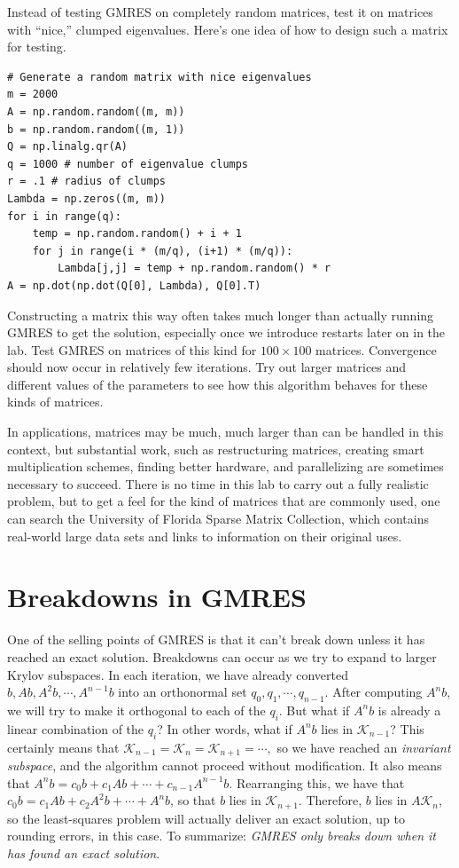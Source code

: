 \begin{problem}
Instead of testing GMRES on completely random matrices, test it on matrices with ``nice,'' clumped eigenvalues.
Here's one idea of how to design such a matrix for testing.
\begin{lstlisting}
# Generate a random matrix with nice eigenvalues
m = 2000
A = np.random.random((m, m))
b = np.random.random((m, 1))
Q = np.linalg.qr(A)
q = 1000 # number of eigenvalue clumps
r = .1 # radius of clumps
Lambda = np.zeros((m, m))
for i in range(q):
    temp = np.random.random() + i + 1
    for j in range(i * (m/q), (i+1) * (m/q)):
        Lambda[j,j] = temp + np.random.random() * r
A = np.dot(np.dot(Q[0], Lambda), Q[0].T)
\end{lstlisting}
Constructing a matrix this way often takes much longer than actually running GMRES to get the solution, especially once we introduce restarts later on in the lab.
Test GMRES on matrices of this kind for $100\times 100$ matrices.
Convergence should now occur in relatively few iterations.
Try out larger matrices and different values of the parameters to see how this algorithm behaves for these kinds of matrices.
\label{prob:GMRESClumps}
\end{problem}

\begin{info}
In applications, matrices may be much, much larger than can be handled in this context, but substantial work, such as restructuring matrices, creating smart multiplication schemes, finding better hardware, and parallelizing are sometimes necessary to succeed.
There is no time in this lab to carry out a fully realistic problem, but to get a feel for the kind of matrices that are commonly used, one can search the University of Florida Sparse Matrix Collection, which contains real-world large data sets and links to information on their original uses.
\end{info}

\section*{Breakdowns in GMRES}
One of the selling points of GMRES is that it can't break down unless it has reached an exact solution.
Breakdowns can occur as we try to expand to larger Krylov subspaces.
In each iteration, we have already converted $b,Ab,A^{2}b,\cdots, A^{n-1}b$ into an orthonormal set $q_0,q_1,\cdots,q_{n-1}$.
After computing $A^nb,$ we will try to make it orthogonal to each of the $q_i$.
But what if $A^{n}b$ is already a linear combination of the $q_i$? In other words, what if $A^{n}b$ lies in $\mathcal{K}_{n-1}$?
This certainly means that $\mathcal{K}_{n-1}=\mathcal{K}_n=\mathcal{K}_{n+1}=\cdots,$ so we have reached an \emph{invariant subspace}, and the algorithm cannot proceed without modification.
It also means that $A^{n}b = c_0 b + c_1 A b + \cdots + c_{n-1}A^{n-1}b$.
Rearranging this, we have that $c_0 b = c_1 A b + c_2 A^{2} b + \cdots + A^{n}b$, so that $b$ lies in $\mathcal{K}_{n+1}$.
Therefore, $b$ lies in $A\mathcal{K}_n$, so the least-squares problem will actually deliver an exact solution, up to rounding errors, in this case.
To summarize: \emph{GMRES only breaks down when it has found an exact solution}.

